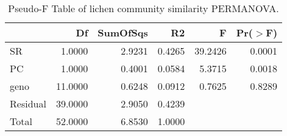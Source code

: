 \begin{table}[ht]
\centering
\begin{tabular}{lrrrrr}
  \hline
 & Df & SumOfSqs & R2 & F & Pr($>$F) \\ 
  \hline
SR & 1.0000 & 2.9231 & 0.4265 & 39.2426 & 0.0001 \\ 
  PC & 1.0000 & 0.4001 & 0.0584 & 5.3715 & 0.0018 \\ 
  geno & 11.0000 & 0.6248 & 0.0912 & 0.7625 & 0.8289 \\ 
  Residual & 39.0000 & 2.9050 & 0.4239 &  &  \\ 
  Total & 52.0000 & 6.8530 & 1.0000 &  &  \\ 
   \hline
\end{tabular}
\caption{Pseudo-F Table of lichen community similarity PERMANOVA.} 
\label{tab:com_perm}
\end{table}
